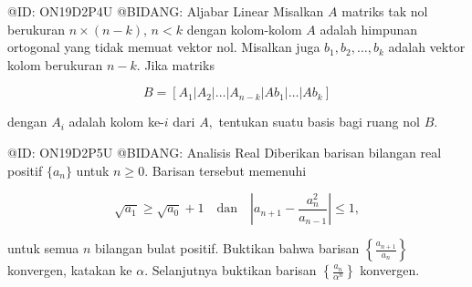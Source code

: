 @ID: ON19D2P4U
@BIDANG: Aljabar Linear
Misalkan $A$ matriks tak nol berukuran $n\times(n-k)$, $n<k$ dengan kolom-kolom $A$ adalah himpunan ortogonal yang tidak memuat vektor nol. Misalkan juga $b_{1}, b_{2}, \dots, b_{k}$ adalah vektor kolom berukuran $n-k$. Jika matriks

$$
B=[A_{1}|A_{2}|\dots|A_{n-k}|Ab_{1}|\dots|Ab_{k}]
$$

dengan $A_{i}$ adalah kolom ke-$i$ dari $A,$ tentukan suatu basis bagi ruang nol $B$.

@ID: ON19D2P5U
@BIDANG: Analisis Real
Diberikan barisan bilangan real positif $\{a_{n}\}$ untuk $n\ge0$. Barisan tersebut memenuhi

$$
\sqrt{a_{1}}\ge\sqrt{a_{0}}+1 \quad \text{dan} \quad \left|a_{n+1}-\frac{a_{n}^{2}}{a_{n-1}}\right|\le1,
$$

untuk semua $n$ bilangan bulat positif. Buktikan bahwa barisan $\left\{\frac{a_{n+1}}{a_{n}}\right\}$ konvergen, katakan ke $\alpha$. Selanjutnya buktikan barisan $\left\{\frac{a_{n}}{\alpha^{n}}\right\}$ konvergen.
